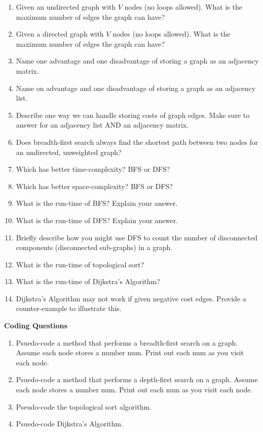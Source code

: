 \documentclass[10pt]{article}
\begin{document}
\begin{enumerate}
	\setlength\itemsep{0.25em}
	\item Given an undirected graph with $V$ nodes (no loops allowed). What is the maximum number of edges the graph can have?
	\item Given a directed graph with $V$ nodes (no loops allowed). What is the maximum number of edges the graph can have?
	\item Name one advantage and one disadvantage of storing a graph as an adjacency matrix.
	\item Name on advantage and one disadvantage of storing a graph as an adjacency list.
	\item Describe one way we can handle storing costs of graph edges. Make sure to answer for an adjacency list AND an adjacency matrix.
	\item Does breadth-first search always find the shortest path between two nodes for an undirected, unweighted graph?
	\item Which has better time-complexity? BFS or DFS?
	\item Which has better space-complexity? BFS or DFS?
	\item What is the run-time of BFS? Explain your answer.
	\item What is the run-time of DFS? Explain your answer.
	\item Briefly describe how you might use DFS to count the number of disconnected components (disconnected sub-graphs) in a graph.
	\item What is the run-time of topological sort?
	\item What is the run-time of Dijkstra's Algorithm?
	\item Dijkstra's Algorithm may not work if given negative cost edges. Provide a counter-example to illustrate this.
\end{enumerate}

\vspace{0.5in}

\textbf{Coding Questions}
\begin{enumerate}
	\setlength\itemsep{0.25em}
	\item Psuedo-code a method that performs a breadth-first search on a graph. Assume each node stores a number num. Print out each num as you visit each node.
	\item Psuedo-code a method that performs a depth-first search on a graph. Assume each node stores a number num. Print out each num as you visit each node.
	\item Pseudo-code the topological sort algorithm.
	\item Psuedo-code Dijkstra's Algorithm.
\end{enumerate}
\end{document}
